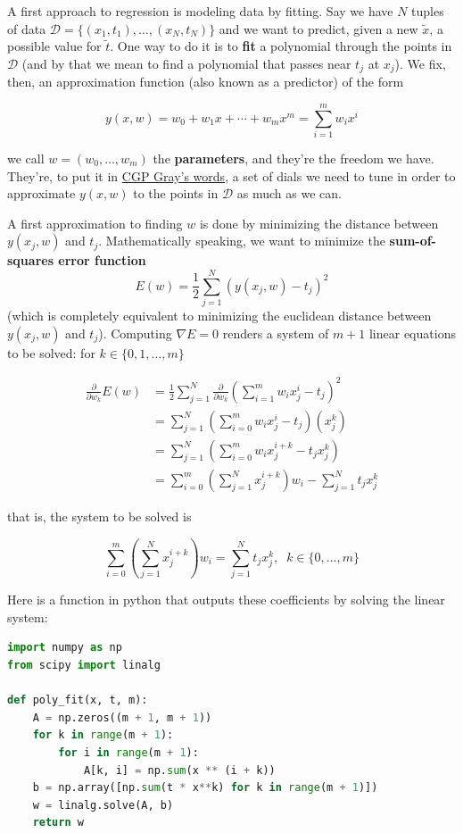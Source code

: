 \documentclass{report}
\begin{document}
A first approach to regression is modeling data by fitting. Say we have $N$ tuples of data $\mathcal{D} = \{(x_1, t_1), \dots, (x_N, t_N)\}$ and we want to predict, given a new $\widetilde{x}$, a possible value for $\widetilde{t}$. One way to do it is to \textbf{fit} a polynomial through the points in $\mathcal{D}$ (and by that we mean to find a polynomial that passes near $t_j$ at $x_j$). We fix, then, an approximation function (also known as a predictor) of the form

\[y(x,w) = w_0 + w_1x + \cdots + w_mx^m = \sum_{i=1}^m w_ix^i\]

we call $w = (w_0, \dots, w_m)$ the \textbf{parameters}, and they're the freedom we have. They're, to put it in \href{https://youtu.be/wvWpdrfoEv0}{CGP Gray's words}, a set of dials we need to tune in order to approximate $y(x,w)$ to the points in $\mathcal{D}$ as much as we can.

A first approximation to finding $w$ is done by minimizing the distance between $y(x_j, w)$ and $t_j$. Mathematically speaking, we want to minimize the \textbf{sum-of-squares error function}
\[E(w) = \frac{1}{2}\sum_{j=1}^N(y(x_j,w) - t_j)^2\]
(which is completely equivalent to minimizing the euclidean distance between $y(x_j, w)$ and $t_j$). Computing $\nabla E = 0$ renders a system of $m+1$ linear equations to be solved: for $k\in\{0,1,\dots,m\}$

\begin{align*}
	\frac{\partial}{\partial w_k} E(w) &= \frac{1}{2}\sum_{j=1}^N\frac{\partial}{\partial w_k}\left(\sum_{i=1}^mw_ix_j^i - t_j\right)^2\\
	&= \sum_{j=1}^N \left(\sum_{i=0}^mw_ix_j^i - t_j\right)(x_j^k)\\
	&= \sum_{j=1}^N \left(\sum_{i=0}^mw_ix_j^{i+k} - t_jx_j^k\right)\\
	&= \sum_{i=0}^m\left(\sum_{j=1}^N x_j^{i+k}\right) w_i - \sum_{j=1}^Nt_jx_j^k
\end{align*}

that is, the system to be solved is

\[\sum_{i=0}^m\left(\sum_{j=1}^N x_j^{i+k}\right) w_i = \sum_{j=1}^Nt_jx_j^k,\;\; k\in\{0,\dots,m\}\]

Here is a function in python that outputs these coefficients by solving the linear system:

\begin{mdframed}[backgroundcolor=black!10]
\begin{lstlisting}[language=python]
import numpy as np
from scipy import linalg

def poly_fit(x, t, m):
    A = np.zeros((m + 1, m + 1))
    for k in range(m + 1):
        for i in range(m + 1):
            A[k, i] = np.sum(x ** (i + k))
    b = np.array([np.sum(t * x**k) for k in range(m + 1)])
    w = linalg.solve(A, b)
    return w
\end{lstlisting}	
\end{mdframed}
\end{document}
